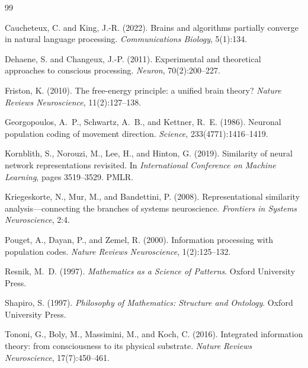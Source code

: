 \documentclass[11pt]{article}
\begin{document}

\begin{thebibliography}{99}

Caucheteux, C. and King, J.-R. (2022).
\newblock Brains and algorithms partially converge in natural language processing.
\newblock \emph{Communications Biology}, 5(1):134.

Dehaene, S. and Changeux, J.-P. (2011).
\newblock Experimental and theoretical approaches to conscious processing.
\newblock \emph{Neuron}, 70(2):200--227.

Friston, K. (2010).
\newblock The free-energy principle: a unified brain theory?
\newblock \emph{Nature Reviews Neuroscience}, 11(2):127--138.

Georgopoulos, A.~P., Schwartz, A.~B., and Kettner, R.~E. (1986).
\newblock Neuronal population coding of movement direction.
\newblock \emph{Science}, 233(4771):1416--1419.

Kornblith, S., Norouzi, M., Lee, H., and Hinton, G. (2019).
\newblock Similarity of neural network representations revisited.
\newblock In \emph{International Conference on Machine Learning}, pages 3519--3529. PMLR.

Kriegeskorte, N., Mur, M., and Bandettini, P. (2008).
\newblock Representational similarity analysis---connecting the branches of systems neuroscience.
\newblock \emph{Frontiers in Systems Neuroscience}, 2:4.

Pouget, A., Dayan, P., and Zemel, R. (2000).
\newblock Information processing with population codes.
\newblock \emph{Nature Reviews Neuroscience}, 1(2):125--132.

Resnik, M.~D. (1997).
\newblock \emph{Mathematics as a Science of Patterns}.
\newblock Oxford University Press.

Shapiro, S. (1997).
\newblock \emph{Philosophy of Mathematics: Structure and Ontology}.
\newblock Oxford University Press.

Tononi, G., Boly, M., Massimini, M., and Koch, C. (2016).
\newblock Integrated information theory: from consciousness to its physical substrate.
\newblock \emph{Nature Reviews Neuroscience}, 17(7):450--461.

\end{thebibliography}
\end{document}

